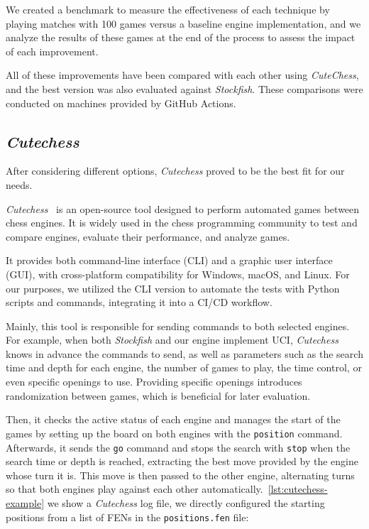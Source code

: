 \noindent We created a benchmark to measure the effectiveness of each technique by playing matches with 100 games versus a baseline engine implementation, and we analyze the results of these games at the end of the process to assess the impact of each improvement.


All of these improvements have been compared with each other using \textit{CuteChess}, and the best version was also evaluated against \textit{Stockfish}. These comparisons were conducted on machines provided by GitHub Actions.

\subsection*{\textit{Cutechess}}

\noindent After considering different options, \textit{Cutechess} proved to be the best fit for our needs.

\vspace{1em}

\noindent \textit{Cutechess}~\cite{CuteChess} is an open-source tool designed to perform automated games between chess engines. It is widely used in the chess programming community to test and compare engines, evaluate their performance, and analyze games.

\vspace{1em}

\noindent It provides both command-line interface (CLI) and a graphic user interface (GUI), with cross-platform compatibility for Windows, macOS, and Linux. For our purposes, we utilized the CLI version to automate the tests with Python scripts and commands, integrating it into a CI/CD workflow.

\vspace{1em}

\noindent Mainly, this tool is responsible for sending commands to both selected engines. For example, when both \textit{Stockfish} and our engine implement UCI, \textit{Cutechess} knows in advance the commands to send, as well as parameters such as the search time and depth for each engine, the number of games to play, the time control, or even specific openings to use. Providing specific openings introduces randomization between games, which is beneficial for later evaluation.

\vspace{1em}

\noindent Then, it checks the active status of each engine and manages the start of the games by setting up the board on both engines with the \texttt{position} command. Afterwards, it sends the \texttt{go} command and stops the search with \texttt{stop} when the search time or depth is reached, extracting the best move provided by the engine whose turn it is. This move is then passed to the other engine, alternating turns so that both engines play against each other automatically.~\cref{lst:cutechess-example} we show a \textit{Cutechess} log file, we directly configured the starting positions from a list of FENs in the \texttt{positions.fen} file:

